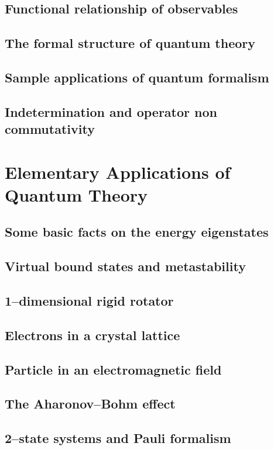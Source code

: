 \documentclass{article}
\begin{document}
\subsection{Functional relationship of observables}
\subsection{The formal structure of quantum theory}
\subsection{Sample applications of quantum formalism}
\subsection{Indetermination and operator non commutativity}

\section{Elementary Applications of Quantum Theory}
\subsection{Some basic facts on the energy eigenstates}
\subsection{Virtual bound states and metastability}
\subsection{1–dimensional rigid rotator}
\subsection{Electrons in a crystal lattice}
\subsection{Particle in an electromagnetic field}
\subsection{The Aharonov–Bohm effect}
\subsection{2–state systems and Pauli formalism}
\end{document}
